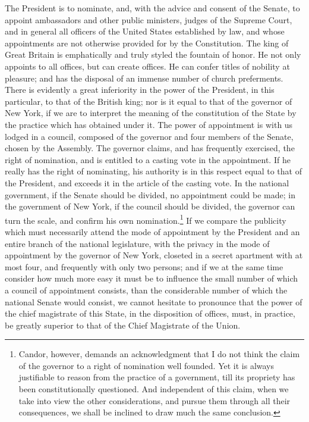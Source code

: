 The President is to nominate, and, with the advice and consent of the Senate, to appoint ambassadors and other public ministers, judges of the Supreme Court, and in general all officers of the United States established by law, and whose appointments are not otherwise provided for by the Constitution. The king of Great Britain is emphatically and truly styled the fountain of honor. He not only appoints to all offices, but can create offices. He can confer titles of nobility at pleasure; and has the disposal of an immense number of church preferments. There is evidently a great inferiority in the power of the President, in this particular, to that of the British king; nor is it equal to that of the governor of New York, if we are to interpret the meaning of the constitution of the State by the practice which has obtained under it. The power of appointment is with us lodged in a council, composed of the governor and four members of the Senate, chosen by the Assembly. The governor claims, and has frequently exercised, the right of nomination, and is entitled to a casting vote in the appointment. If he really has the right of nominating, his authority is in this respect equal to that of the President, and exceeds it in the article of the casting vote. In the national government, if the Senate should be divided, no appointment could be made; in the government of New York, if the council should be divided, the governor can turn the scale, and confirm his own nomination.\footnote{Candor, however, demands an acknowledgment that I do not think the claim of the governor to a right of nomination well founded. Yet it is always justifiable to reason from the practice of a government, till its propriety has been constitutionally questioned. And independent of this claim, when we take into view the other considerations, and pursue them through all their consequences, we shall be inclined to draw much the same conclusion.} If we compare the publicity which must necessarily attend the mode of appointment by the President and an entire branch of the national legislature, with the privacy in the mode of appointment by the governor of New York, closeted in a secret apartment with at most four, and frequently with only two persons; and if we at the same time consider how much more easy it must be to influence the small number of which a council of appointment consists, than the considerable number of which the national Senate would consist, we cannot hesitate to pronounce that the power of the chief magistrate of this State, in the disposition of offices, must, in practice, be greatly superior to that of the Chief Magistrate of the Union.

